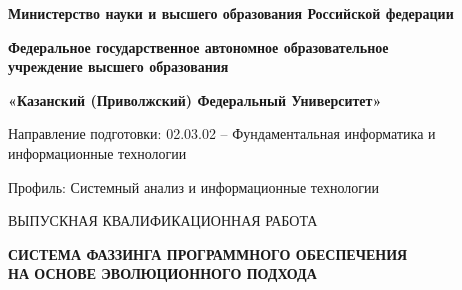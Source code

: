 \thispagestyle{empty}
\begin{titlepage}
	\begin{singlespace}
	\setlength{\abovedisplayskip}{0pt}
	\setlength{\belowdisplayskip}{0pt}
	
	\begin{center}
		\fontsize{14}{14}\bf
		Министерство науки и высшего образования Российской федерации
	\end{center}
	\vspace{-1cm}
	\begin{center}
		\fontsize{14}{14}\bf
		Федеральное государственное автономное образовательное\\ учреждение высшего образования
	\end{center}
	\vspace{-1cm}
	\begin{center}
		\fontsize{12}{12}\bf «Казанский (Приволжский) Федеральный Университет»
	\end{center}
	\vspace{-1cm}
	\begin{center}
	\end{center}
	\vspace{-1cm}
	\begin{center}
	\end{center}
	\vspace{1.5cm}
	\begin{center}
		\fontsize{14}{14} Направление подготовки: 02.03.02 -- Фундаментальная информатика и информационные технологии
	\end{center}
	\vspace{-1cm}
	\begin{center}
		\fontsize{14}{14} Профиль: Системный анализ и информационные технологии
	\end{center}

	\begin{center}
		\MakeUppercase{выпускная квалификационная работа}
		\vspace{0.4cm}
		
		\bf \MakeUppercase{Система фаззинга программного обеспечения \\ на основе эволюционного подхода}
	\end{center}

	\end{singlespace}

	\vspace{5cm}


\end{titlepage}
